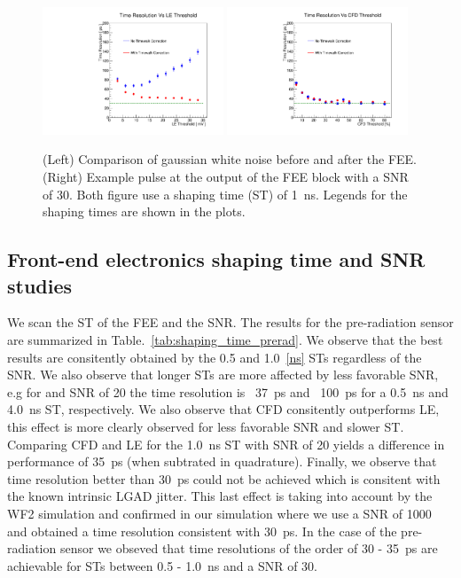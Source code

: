 \documentclass[preprint,1p]{elsarticle}
\begin{document}
\begin{figure}[htbp]
  \centering
  \includegraphics[width=0.48\textwidth]{figs/ShapingTime1p0_SNR30_55MicronGain15Prerad_FIXED_NOISE_FIXED_SNR_V2_converted_TimeResolutionVsThresholdToT.pdf} \hfill
  \includegraphics[width=0.48\textwidth]{figs/ShapingTime1p0_SNR30_55MicronGain15Prerad_FIXED_NOISE_FIXED_SNR_V2_converted_TimeResolutionVsThresholdCFD.pdf}
  \caption{(Left) Comparison of gaussian white noise before and after the FEE.
  (Right) Example pulse at the output of the FEE block with a SNR of 30. Both figure use a shaping time (ST) of 1~\si{ns}. Legends for the shaping times are shown in the plots.}
  \label{fig:time_resolution_scan}
\end{figure}

\subsection{Front-end electronics shaping time and SNR studies}\label{sec:shaping_time}
We scan the ST of the FEE and the SNR. The results for the pre-radiation sensor are summarized in Table.~\ref{tab:shaping_time_prerad}.
 We observe that the best results are consitently obtained by the 0.5 and 1.0~\ref{ns} STs regardless of the SNR. We also observe that
 longer STs are more affected by less favorable SNR, e.g for and SNR of 20 the time resolution is ~37~\si{ps} and ~100~\si{ps} for a
 0.5~\si{ns} and 4.0~\si{ns} ST, respectively. We also observe that CFD consitently outperforms LE, this effect is more clearly observed
 for less favorable SNR and slower ST. Comparing CFD and LE for the 1.0~\si{ns} ST with SNR of 20 yields a difference in performance of
 35~\si{ps} (when subtrated in quadrature). Finally, we observe that time resolution better than 30~\si{ps} could not be achieved which
 is consitent with the known intrinsic LGAD jitter. This last effect is taking into account by the WF2 simulation and confirmed in our
 simulation where we use a SNR of 1000 and obtained a time resolution consistent with 30~\si{ps}. In the case of the pre-radiation sensor
 we obseved that time resolutions of the order of 30 - 35~\si{ps} are achievable for STs between 0.5 - 1.0~\si{ns} and a SNR of 30.
\end{document}
